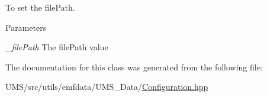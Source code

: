 To set the filePath. 


\begin{DoxyParams}{Parameters}
\item[{\em \_\-filePath}]The filePath value \end{DoxyParams}


The documentation for this class was generated from the following file:\begin{DoxyCompactItemize}
\item 
UMS/src/utils/emfdata/UMS\_\-Data/\hyperlink{Configuration_8hpp}{Configuration.hpp}\end{DoxyCompactItemize}
